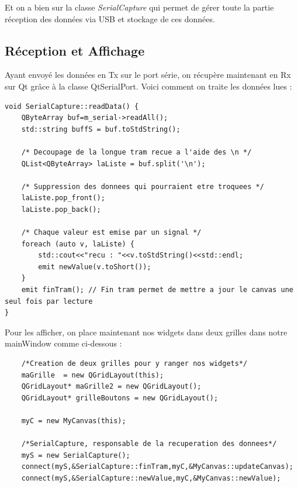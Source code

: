 \documentclass[11pt, french]{article}
\begin{document}
Et on a bien sur la classe \emph{SerialCapture} qui permet de gérer toute la partie réception des données via USB et stockage de ces données.

\newpage

\subsection{Réception et Affichage}

Ayant envoyé les données en Tx sur le port série, on récupère maintenant en Rx sur Qt grâce à la classe QtSerialPort. Voici comment on traite les données lues :

\vspace*{3mm}

\begin{lstlisting}
void SerialCapture::readData() {
    QByteArray buf=m_serial->readAll();
    std::string buffS = buf.toStdString();
    
    /* Decoupage de la longue tram recue a l'aide des \n */
    QList<QByteArray> laListe = buf.split('\n');

    /* Suppression des donnees qui pourraient etre troquees */
    laListe.pop_front();
    laListe.pop_back();

    /* Chaque valeur est emise par un signal */
    foreach (auto v, laListe) {
        std::cout<<"recu : "<<v.toStdString()<<std::endl;
        emit newValue(v.toShort());
    }
    emit finTram(); // Fin tram permet de mettre a jour le canvas une seul fois par lecture
}
\end{lstlisting}
\vspace{3mm}

Pour les afficher, on place maintenant nos widgets dans deux grilles dans notre mainWindow comme ci-dessous :

\vspace{3mm}
\begin{lstlisting}
    /*Creation de deux grilles pour y ranger nos widgets*/
    maGrille  = new QGridLayout(this);
    QGridLayout* maGrille2 = new QGridLayout();
    QGridLayout* grilleBoutons = new QGridLayout();

    myC = new MyCanvas(this);

    /*SerialCapture, responsable de la recuperation des donnees*/
    myS = new SerialCapture();
    connect(myS,&SerialCapture::finTram,myC,&MyCanvas::updateCanvas);
    connect(myS,&SerialCapture::newValue,myC,&MyCanvas::newValue);
\end{lstlisting}
\end{document}
